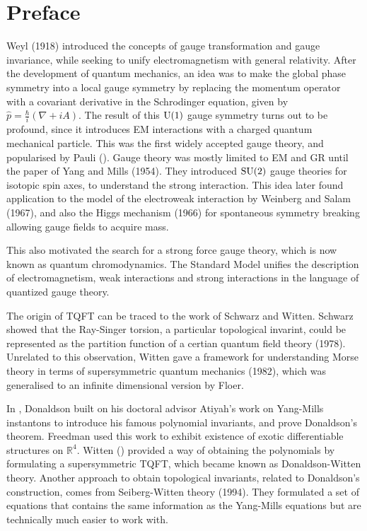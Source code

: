 \chapter*{Preface}\label{preface}

Weyl (1918) introduced the concepts of gauge transformation and gauge
invariance, while seeking to unify electromagnetism with general relativity. After the
development of quantum mechanics, an idea was to make the global phase symmetry
into a local gauge symmetry by replacing the momentum operator with a covariant 
derivative in the Schrodinger equation, given by 
$\widehat{p}=\frac{\hbar}{i}(\nabla+iA)$. The result of this $\operatorname{U}(1)$ gauge symmetry
turns out to be profound, since it introduces EM interactions with a charged
quantum mechanical particle. This was the first widely accepted gauge theory,
and popularised by Pauli (\citeyear{pauli_em}).\cite{pauli_em}
Gauge theory was mostly limited to EM and GR until the paper of Yang and Mills 
(1954). They introduced $\operatorname{SU}(2)$ gauge theories for
isotopic spin axes, to understand the strong interaction. This idea later found
application to the model of the electroweak interaction by Weinberg and Salam
(1967), and also the Higgs mechanism (1966) for spontaneous symmetry breaking
allowing gauge fields to acquire mass. 

This also motivated the search for a strong force gauge theory, which is now
known as quantum chromodynamics. The Standard Model unifies the description of
electromagnetism, weak interactions and strong interactions in the language of
quantized gauge theory. 

The origin of TQFT can be traced to the work of Schwarz and Witten.
Schwarz showed that the Ray-Singer torsion, a particular topological invarint,
could be represented as the partition function of a certian quantum field theory
(1978). Unrelated to this observation, Witten gave a framework for understanding
Morse theory in terms of supersymmetric quantum mechanics (1982), which was 
generalised to an infinite dimensional version by Floer. 

In \citeyear{don83}, Donaldson built on his doctoral advisor Atiyah's work on 
Yang-Mills instantons to introduce his famous polynomial invariants, and prove 
Donaldson's theorem.\cite{don83}
Freedman used this work to exhibit existence of exotic differentiable
structures on $\mathbb{R}^{4}$. 
Witten (\citeyear{wittenTQFT}) provided a way
of obtaining the polynomials by formulating a supersymmetric TQFT, which became
known as Donaldson-Witten theory.\cite{wittenTQFT}
Another approach to obtain topological invariants, related to Donaldson's
construction, comes from Seiberg-Witten theory (1994). They formulated a set of
equations that contains the same information as the Yang-Mills equations but
are technically much easier to work with. 

